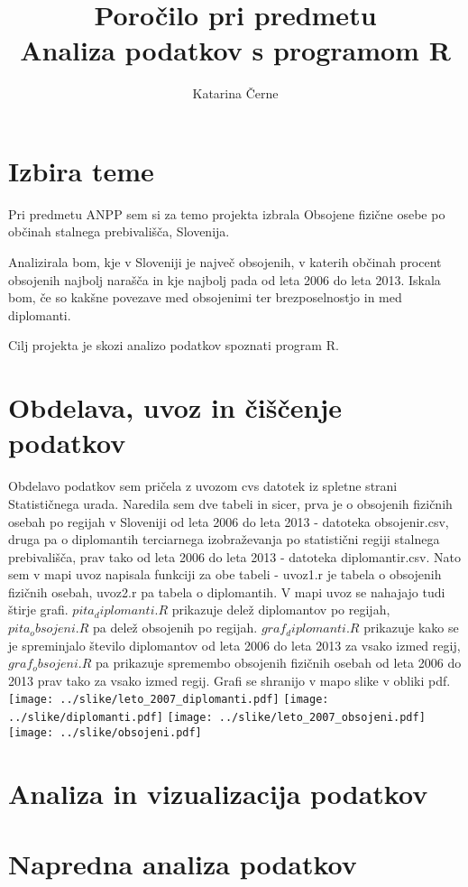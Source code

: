 \documentclass[11pt,a4paper]{article}
\begin{document}
\title{Poročilo pri predmetu \\
Analiza podatkov s programom R}
\author{Katarina Černe}
\maketitle

\section{Izbira teme}

Pri predmetu ANPP sem si za temo projekta izbrala Obsojene fizične osebe po občinah stalnega prebivališča, Slovenija.

Analizirala bom, kje v Sloveniji je največ obsojenih, v katerih občinah procent obsojenih najbolj narašča in kje najbolj pada od leta 2006 do leta 2013. Iskala bom, če so kakšne povezave med obsojenimi ter brezposelnostjo in med diplomanti.

Cilj projekta je skozi analizo podatkov spoznati program R.

\section{Obdelava, uvoz in čiščenje podatkov}

Obdelavo podatkov sem pričela z uvozom cvs datotek iz spletne strani Statističnega urada.
Naredila sem dve tabeli in sicer, prva je o obsojenih fizičnih osebah po regijah v Sloveniji od leta 2006 do leta 2013 - datoteka obsojenir.csv, druga pa o diplomantih terciarnega izobraževanja po statistični regiji stalnega prebivališča, prav tako od leta 2006 do leta 2013 - datoteka diplomantir.csv.
Nato sem v mapi uvoz napisala funkciji za obe tabeli - uvoz1.r je tabela o obsojenih fizičnih osebah, uvoz2.r pa tabela o diplomantih.
V mapi uvoz se nahajajo tudi štirje grafi. $pita_diplomanti.R$ prikazuje delež diplomantov po regijah, $pita_obsojeni.R$ pa delež obsojenih po regijah. $graf_diplomanti.R$ prikazuje kako se je spreminjalo število diplomantov od leta 2006 do leta 2013 za vsako izmed regij, $graf_obsojeni.R$ pa prikazuje spremembo obsojenih fizičnih osebah od leta 2006 do 2013 prav tako za vsako izmed regij. Grafi se shranijo v mapo slike v obliki pdf.
\texttt{[image: ../slike/leto\_2007\_diplomanti.pdf]}
\texttt{[image: ../slike/diplomanti.pdf]}
\texttt{[image: ../slike/leto\_2007\_obsojeni.pdf]}
\texttt{[image: ../slike/obsojeni.pdf]}

\section{Analiza in vizualizacija podatkov}


\section{Napredna analiza podatkov}

\end{document}
